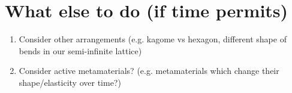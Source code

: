 \section{What else to do (if time permits)}
\begin{enumerate}
  \item Consider other arrangements (e.g. kagome vs hexagon, different shape of
        bends in our semi-infinite lattice)
  \item Consider active metamaterials? (e.g. metamaterials which change their
        shape/elasticity over time?)
\end{enumerate}


